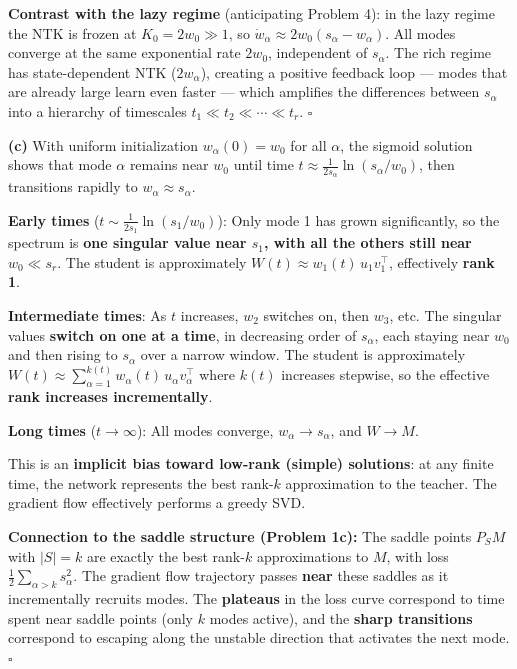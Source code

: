 \documentclass[
]{article}
\begin{document}
\textbf{Contrast with the lazy regime} (anticipating Problem 4): in the
lazy regime the NTK is frozen at \(K_0 = 2w_0 \gg 1\), so
\(\dot{w}_\alpha \approx 2w_0(s_\alpha - w_\alpha)\). All modes converge
at the same exponential rate \(2w_0\), independent of \(s_\alpha\). The
rich regime has state-dependent NTK (\(2w_\alpha\)), creating a positive
feedback loop --- modes that are already large learn even faster ---
which amplifies the differences between \(s_\alpha\) into a hierarchy of
timescales \(t_1 \ll t_2 \ll \cdots \ll t_r\). \(\square\)

\textbf{(c)} With uniform initialization \(w_\alpha(0) = w_0\) for all
\(\alpha\), the sigmoid solution shows that mode \(\alpha\) remains near
\(w_0\) until time \(t \approx \frac{1}{2s_\alpha}\ln(s_\alpha/w_0)\),
then transitions rapidly to \(w_\alpha \approx s_\alpha\).

\textbf{Early times} (\(t \sim \frac{1}{2s_1}\ln(s_1/w_0)\)): Only mode
1 has grown significantly, so the spectrum is \textbf{one singular value
near \(s_1\), with all the others still near \(w_0 \ll s_r\)}. The
student is approximately \(W(t) \approx w_1(t)\,u_1 v_1^\top\),
effectively \textbf{rank 1}.

\textbf{Intermediate times}: As \(t\) increases, \(w_2\) switches on,
then \(w_3\), etc. The singular values \textbf{switch on one at a time},
in decreasing order of \(s_\alpha\), each staying near \(w_0\) and then
rising to \(s_\alpha\) over a narrow window. The student is
approximately
\(W(t) \approx \sum_{\alpha=1}^{k(t)} w_\alpha(t)\,u_\alpha v_\alpha^\top\)
where \(k(t)\) increases stepwise, so the effective \textbf{rank
increases incrementally}.

\textbf{Long times} (\(t \to \infty\)): All modes converge,
\(w_\alpha \to s_\alpha\), and \(W \to M\).

This is an \textbf{implicit bias toward low-rank (simple) solutions}: at
any finite time, the network represents the best rank-\(k\)
approximation to the teacher. The gradient flow effectively performs a
greedy SVD.

\textbf{Connection to the saddle structure (Problem 1c):} The saddle
points \(P_S M\) with \(|S| = k\) are exactly the best rank-\(k\)
approximations to \(M\), with loss
\(\frac{1}{2}\sum_{\alpha > k} s_\alpha^2\). The gradient flow
trajectory passes \textbf{near} these saddles as it incrementally
recruits modes. The \textbf{plateaus} in the loss curve correspond to
time spent near saddle points (only \(k\) modes active), and the
\textbf{sharp transitions} correspond to escaping along the unstable
direction that activates the next mode. \(\square\)
\end{document}
